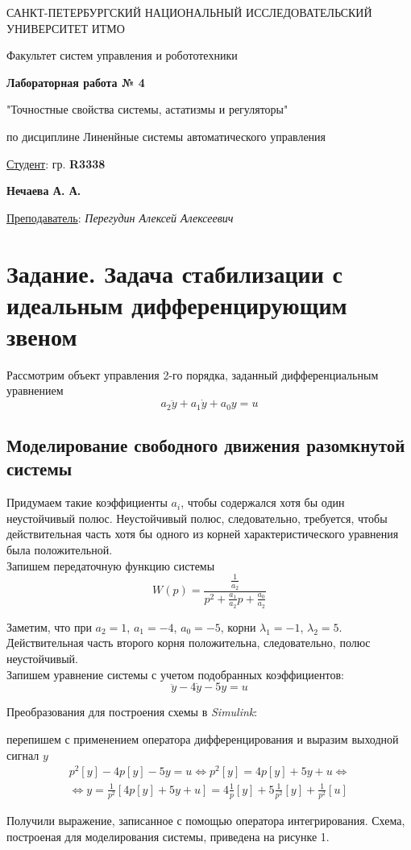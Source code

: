 \documentclass[a5paper, 10pt]{article}
\theoremstyle{definition}
\theoremstyle{plain}
\theoremstyle{remark}
\newcommand*{\titlePage}{
	\thispagestyle{title}
	\begingroup
	\begin{center}
		\vspace*{6ex}
		
		{\small
			САНКТ-ПЕТЕРБУРГСКИЙ НАЦИОНАЛЬНЫЙ ИССЛЕДОВАТЕЛЬСКИЙ УНИВЕРСИТЕТ ИТМО	
		}
		
		\vspace*{2ex}
		
		{\normalsize
			Факультет систем управления и робототехники
		}
		
		\vspace*{15ex}
		
		{\Large \bfseries 
			Лабораторная работа № 4
		}
\vspace*{2ex}
	{\Large \bfseries 
			
"Точностные свойства системы, астатизмы и регуляторы"
		}
\vspace*{2ex}
		
		{\normalsize
			по дисциплине Линенйные системы автоматического управления
		}

	\end{center}
	\vspace*{20ex}
	\begin{flushright}
		{\large 
			\underline{Студент}: гр. \textbf{R3338}\\
			\begin{flushright}
				\textbf{Нечаева А. А.}\\
			\end{flushright}
		}
		
		\vspace*{5ex}
		
		{\large 
			\underline{Преподаватель}: \textit{Перегудин Алексей Алексеевич}
		}
	\end{flushright}	
	\newpage
	\setcounter{page}{1}
	\endgroup}
\begin{document}
	\titlePage
	\pagestyle{style}
\newpage


\section{Задание. Задача стабилизации с идеальным дифференцирующим звеном}

Рассмотрим объект управления 2-го порядка, заданный дифференциальным уравнением
\begin{equation}
a_2 \ddot{y} + a_1 \dot{y} + a_0 y = u
\end{equation}

\subsection{Моделирование свободного движения разомкнутой системы}

Придумаем такие коэффициенты $a_i$, чтобы содержался хотя бы один неустойчивый полюс. Неустойчивый полюс, следовательно, требуется, чтобы действительная часть хотя бы одного из корней характеристического уравнения была положительной.\\

Запишем передаточную функцию системы
\begin{equation}
W(p) = \frac{\frac{1}{a_2}}{p^2 + \frac{a_1}{a_2}p +  \frac{a_0}{a_2}}
\end{equation}

Заметим, что при $a_2 = 1$, $a_1 = -4$, $a_0 = -5$, корни $\lambda_1 = -1$, $\lambda_2 = 5$. Действительная часть второго корня положительна, следовательно, полюс неустойчивый.\\

Запишем уравнение системы с учетом подобранных коэффициентов:
\begin{equation}
 \ddot{y} -4 \dot{y} -5 y = u
\end{equation}

Преобразования для построения схемы в \textit{Simulink}:

перепишем с применением оператора дифференцирования и выразим выходной сигнал $y$
\begin{multline}
p^2[y] - 4p[y] - 5y = u \Leftrightarrow p^2[y] = 4p[y] + 5y + u \Leftrightarrow \\ \Leftrightarrow y = \frac{1}{p^2} \left[ 4p[y] + 5y + u  \right] =
4 \frac{1}{p} [y] + 5 \frac{1}{p^2} [y] + \frac{1}{p^2} [u]
\end{multline}

Получили выражение, записанное с помощью оператора интегрирования. Схема, построеная для моделирования системы, приведена на рисунке 1.
\end{document}
